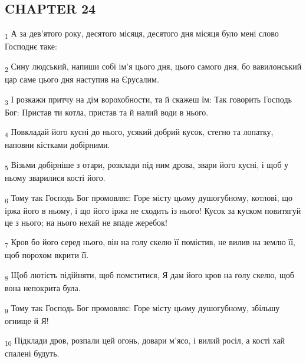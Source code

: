 \subsection{CHAPTER 24}
\begin{tcolorbox}
\textsubscript{1} А за дев'ятого року, десятого місяця, десятого дня місяця було мені слово Господнє таке:
\end{tcolorbox}
\begin{tcolorbox}
\textsubscript{2} Сину людський, напиши собі ім'я цього дня, цього самого дня, бо вавилонський цар саме цього дня наступив на Єрусалим.
\end{tcolorbox}
\begin{tcolorbox}
\textsubscript{3} І розкажи притчу на дім ворохобности, та й скажеш їм: Так говорить Господь Бог: Пристав ти котла, пристав та й налий води в нього.
\end{tcolorbox}
\begin{tcolorbox}
\textsubscript{4} Повкладай його кусні до нього, усякий добрий кусок, стегно та лопатку, наповни кістками добірними.
\end{tcolorbox}
\begin{tcolorbox}
\textsubscript{5} Візьми добірніше з отари, розклади під ним дрова, звари його кусні, і щоб у ньому зварилися кості його.
\end{tcolorbox}
\begin{tcolorbox}
\textsubscript{6} Тому так Господь Бог промовляє: Горе місту цьому душогубному, котлові, що іржа його в ньому, і що його іржа не сходить із нього! Кусок за куском повитягуй це з нього; на нього нехай не впаде жеребок!
\end{tcolorbox}
\begin{tcolorbox}
\textsubscript{7} Кров бо його серед нього, він на голу скелю її помістив, не вилив на землю її, щоб порохом вкрити її.
\end{tcolorbox}
\begin{tcolorbox}
\textsubscript{8} Щоб лютість підійняти, щоб помститися, Я дам його кров на голу скелю, щоб вона непокрита була.
\end{tcolorbox}
\begin{tcolorbox}
\textsubscript{9} Тому так Господь Бог промовляє: Горе місту цьому душогубному, збільшу огнище й Я!
\end{tcolorbox}
\begin{tcolorbox}
\textsubscript{10} Підклади дров, розпали цей огонь, довари м'ясо, і вилий росіл, а кості хай спалені будуть.
\end{tcolorbox}
